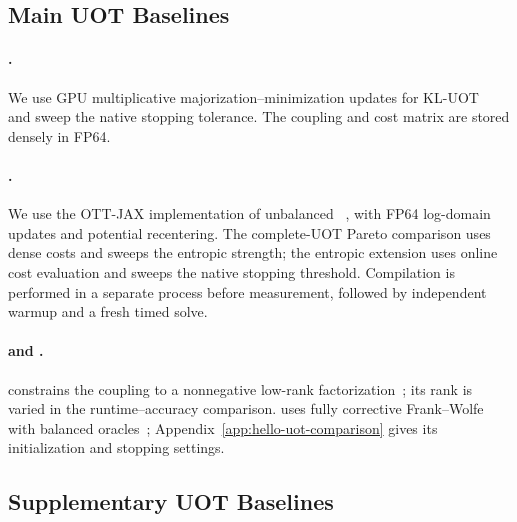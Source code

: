 \subsection{Main UOT Baselines}
\label{app:implementation-uot-baselines}

\paragraph{\mm.}
We use GPU multiplicative majorization--minimization updates for KL-UOT~\citep{chapel2021unbalanced} and sweep the native stopping tolerance.
The coupling and cost matrix are stored densely in FP64.

\paragraph{\sinkhorn.}
We use the OTT-JAX implementation of unbalanced \sinkhorn~\citep{chizat2018scaling}, with FP64 log-domain updates and potential recentering.
The complete-UOT Pareto comparison uses dense costs and sweeps the entropic strength; the entropic extension uses online cost evaluation and sweeps the native stopping threshold.
Compilation is performed in a separate process before measurement, followed by independent warmup and a fresh timed solve.

\paragraph{\ulot and \hellouot.}
\ulot constrains the coupling to a nonnegative low-rank factorization~\citep{scetbon2023unbalanced}; its rank is varied in the runtime--accuracy comparison.
\hellouot uses fully corrective Frank--Wolfe with balanced \hello oracles~\citep{xia2026dual}; Appendix~\ref{app:hello-uot-comparison} gives its initialization and stopping settings.

\subsection{Supplementary UOT Baselines}
\label{app:implementation-extra-baselines}

